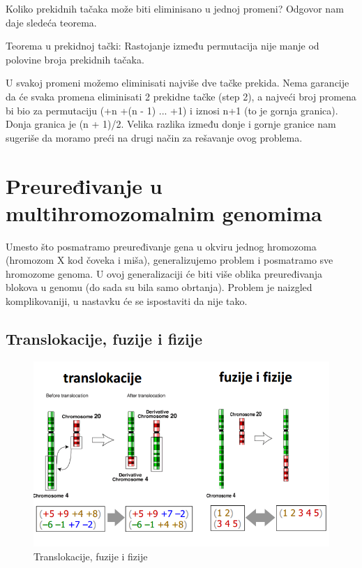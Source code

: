 \noindent Koliko prekidnih tačaka može biti eliminisano u jednoj promeni? Odgovor nam daje sledeća teorema.

\begin{teorema}
{Teorema u prekidnoj tački: Rastojanje između permutacija nije manje od polovine broja prekidnih tačaka.}
\end{teorema}


U svakoj promeni možemo eliminisati najviše dve tačke prekida. Nema garancije da će svaka promena eliminisati 2 prekidne tačke (step 2), a najveći broj promena bi bio za permutaciju (+n +(n - 1) ... +1) i iznosi n+1 (to je gornja granica). Donja granica je (n + 1)/2. Velika razlika između donje i gornje granice nam sugeriše da moramo preći na drugi način za rešavanje ovog problema.


\section{Preuređivanje u multihromozomalnim genomima}

Umesto što posmatramo preuređivanje gena u okviru
jednog hromozoma (hromozom X kod čoveka i miša),
generalizujemo problem i posmatramo sve 
hromozome genoma. U ovoj generalizaciji će biti više oblika
preuređivanja blokova u genomu (do sada su bila
samo obrtanja). Problem je naizgled komplikovaniji, u nastavku će
se ispostaviti da nije tako. 

\subsection{Translokacije, fuzije i fizije}

\begin{figure}[h!]
\centering
\includegraphics[scale=0.45]{poglavlja/6/slike/preuredjivanja.PNG}
\caption{Translokacije, fuzije i fizije}
\label{slika:translokacije}
\end{figure}


